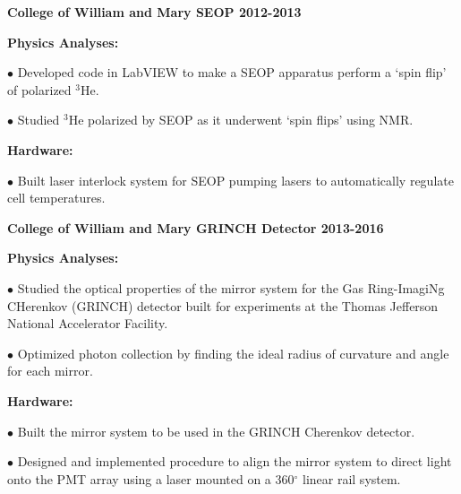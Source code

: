 \documentclass[letterpaper,10pt]{article}
\renewenvironment{itemize}{
  \begin{list}{}{
    \setlength{\leftmargin}{1.5em}
  }
}{
  \end{list}
}
\begin{document}
{\begin{itemize}
\begin{itemize}
\end{itemize}

\item {\large {\bf College of William and Mary SEOP 2012-2013} }
 \begin{itemize}\itemsep5pt \parskip0pt 
  \item \textbf{Physics Analyses:}
   
    \begin{itemize}\itemsep5pt
     \item $\bullet$ Developed code in LabVIEW to make a SEOP apparatus perform a `spin flip' of polarized $^{3}$He.
     \item $\bullet$ Studied $^{3}$He polarized by SEOP as it underwent `spin flips' using NMR.
     \end{itemize}

  \item \textbf{Hardware:}
    \begin{itemize}\itemsep5pt
     \item $\bullet$ Built laser interlock system for SEOP pumping lasers to automatically regulate cell temperatures. 
    \end{itemize}
 
\end{itemize}

\item {\large {\bf College of William and Mary GRINCH Detector 2013-2016} }
 \begin{itemize}\itemsep5pt \parskip0pt 
  \item \textbf{Physics Analyses:}
   
    \begin{itemize}\itemsep5pt \parskip0pt 
     \item $\bullet$ Studied the optical properties of the mirror system for the Gas Ring-ImagiNg CHerenkov (GRINCH) detector built for experiments at the Thomas Jefferson National Accelerator Facility. 
     \item $\bullet$ Optimized photon collection by finding the ideal radius of curvature and angle for each mirror.
     \end{itemize}

  \item \textbf{Hardware:}
    \begin{itemize}\itemsep5pt \parskip0pt 
     \item $\bullet$ Built the mirror system to be used in the GRINCH Cherenkov detector.
     \item $\bullet$ Designed and implemented procedure to align the mirror system to direct light onto the PMT array using a laser mounted on a 360$^\circ$ linear rail system.
    \end{itemize}
    

\end{itemize}
\end{itemize}}
\end{document}
